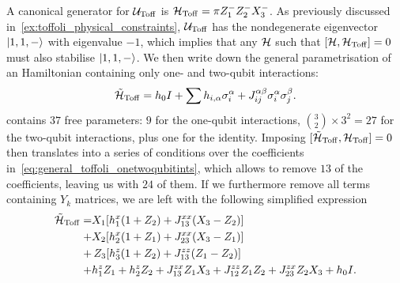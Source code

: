 A canonical generator for ${\mathcal{U}}_{\operatorname{Toff}}$ is ${\mathcal{H}}_{\operatorname{Toff}}=\pi Z_1^- Z_2^- X_3^-$.
As previously discussed in~\cref{ex:toffoli_physical_constraints}, ${\mathcal{U}}_{\operatorname{Toff}}$ has the nondegenerate eigenvector $\ket{1,1,-}$ with eigenvalue $-1$, which implies that any ${\mathcal{H}}$ such that $[{\mathcal{H}},{\mathcal{H}}_{\operatorname{Toff}}]=0$ must also stabilise $\ket{1,1,-}$.
We then write down the general parametrisation of an Hamiltonian containing only one- and two-qubit interactions:
\begin{equation}
    \tilde{{\mathcal{H}}}_{\operatorname{Toff}} =
    h_0 I + \sum h_{i,\alpha}\sigma_i^\alpha
    + J_{ij}^{\alpha\beta}\sigma_i^\alpha\sigma_j^\beta.
    \label{eq:general_toffoli_onetwoqubitints}
\end{equation}
 contains $37$ free parameters: $9$ for the one-qubit interactions, $\binom{3}{2}\times 3^2=27$ for the two-qubit interactions, plus one for the identity.
Imposing $[\tilde{{\mathcal{H}}}_{\operatorname{Toff}},{\mathcal{H}}_{\operatorname{Toff}}]=0$ then translates into a series of conditions over the coefficients in~\cref{eq:general_toffoli_onetwoqubitints}, which allows to remove $13$ of the coefficients, leaving us with $24$ of them.
If we furthermore remove all terms containing $Y_k$ matrices, we are left with the following simplified expression
\begin{equation}
\begin{aligned}
    \tilde{{\mathcal{H}}}_{\operatorname{Toff}} =
    & X_1 [h_1^x (1 + Z_2) + J_{13}^{xx} (X_3 - Z_2)] \\
    +&X_2 [h_2^x (1 + Z_1) + J_{23}^{xx} (X_3 - Z_1)] \\
    +&\,Z_3 [h_3^z(1 + Z_2) + J_{13}^{zz} (Z_1 - Z_2)] \\
    + &h_1^z Z_1 + h_2^z Z_2
    + J_{13}^{zx} Z_1 X_3 + J_{12}^{zz} Z_1 Z_2 + J_{23}^{zx} Z_2 X_3
    +h_0 I.
    \label{eq:general_toffoli_onetwoqubitints_without_Ys}
\end{aligned}
\end{equation}
